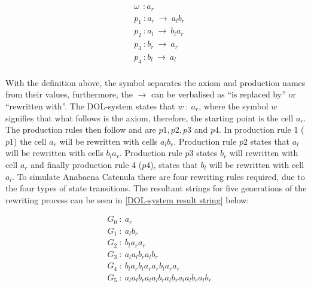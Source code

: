 \begin{equation} \label{DOL-system example}
\begin{aligned}
	&\omega~~ : a_r \\
	&p_1~ :  a_r~ \rightarrow~ a_l b_r\\
	&p_2~ :  a_l~ \rightarrow~ b_l a_r\\
	&p_3~ :  b_r~ \rightarrow~ a_r\\
	&p_4~ :  b_l~ \rightarrow~ a_l\\
\end{aligned}
\end{equation}

\noindent
With the definition above, the \say{:} symbol separates the axiom and production names from their values, furthermore, the $\rightarrow$ can be verbalised as ``is replaced by'' or ``rewritten with''. The DOL-system states that $w~ :~ a_r$, where the symbol $w$ signifies that what follows is the axiom, therefore, the starting point is the cell $a_r$. The production rules then follow and are $p1, p2, p3$ and $p4$. In production rule 1 ($p1$) the cell $a_r$ will be rewritten with cells $a_l b_r$. Production rule $p2$ states that $a_l$ will be rewritten with cells $b_l a_r$. Production rule $p3$ states $b_r$ will rewritten with cell $a_r$ and finally production rule 4 ($p4$), states that $b_l$ will be rewritten with cell $a_l$. To simulate Anabaena Catenula there are four rewriting rules required, due to the four types of state transitions. The resultant strings for five generations of the rewriting process can be seen in \ref{DOL-system result string} below: 

\begin{equation} \label{DOL-system result string}
\begin{aligned}
	& G_0~ :~ a_r \\
	& G_1~ :~ a_l b_r \\
	& G_2~ :~ b_l a_r a_r \\
	& G_3~ :~ a_l a_l b_r a_l b_r \\
	& G_4~ :~ b_l a_r b_l a_r a_r b_l a_r a_r \\
	& G_5~ :~ a_l a_l b_r a_l a_l b_r a_l b_r a_l a_l b_r a_l b_r \\
\end{aligned}
\end{equation}

